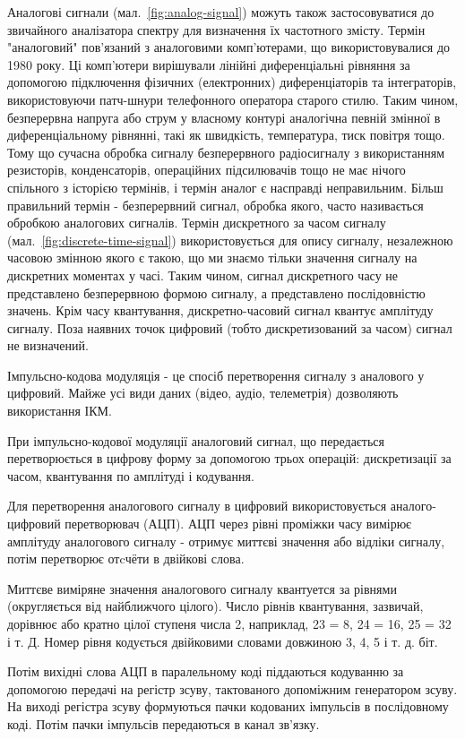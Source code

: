 Аналогові сигнали (мал.~\ref{fig:analog-signal}) можуть також застосовуватися до звичайного аналізатора спектру для визначення їх частотного змісту. Термін "аналоговий" пов'язаний з аналоговими комп'ютерами, що використовувалися до 1980 року. Ці комп'ютери вирішували лінійні диференціальні рівняння за допомогою підключення фізичних (електронних) диференціаторів та інтеграторів, використовуючи патч-шнури телефонного оператора старого стилю. Таким чином, безперервна напруга або струм у власному контурі аналогічна певній змінної в диференціальному рівнянні, такі як швидкість, температура, тиск повітря тощо. Тому що сучасна обробка сигналу безперервного радіосигналу з використанням резисторів, конденсаторів, операційних підсилювачів тощо не має нічого спільного з історією термінів, і термін аналог є насправді неправильним. Більш правильний термін - безперервний сигнал, обробка якого, часто називається обробкою аналогових сигналів. 
Термін дискретного за часом сигналу (мал.~\ref{fig:discrete-time-signal}) використовується для опису сигналу, незалежною часовою змінною якого є такою, що ми знаємо тільки значення сигналу на дискретних моментах у часі. Таким чином, сигнал дискретного часу не представлено безперервною формою сигналу, а представлено послідовністю значень. Крім часу квантування, дискретно-часовий сигнал квантує амплітуду сигналу. \cite{lyons2004understanding} Поза наявних точок цифровий (тобто дискретизований за часом) сигнал не визначений.

Імпульсно-кодова модуляція - це спосіб перетворення сигналу з аналового у цифровий. Майже усі види даних (відео, аудіо, телеметрія) дозволяють використання ІКМ.

При імпульсно-кодової модуляції аналоговий сигнал, що передається перетворюється в цифрову форму за допомогою трьох операцій: дискретизації за часом, квантування по амплітуді і кодування.

Для перетворення аналогового сигналу в цифровий використовується аналого-цифровий перетворювач (АЦП). АЦП через рівні проміжки часу вимірює амплітуду аналогового сигналу - отримує миттєві значення або відліки сигналу, потім перетворює отcчёти в двійкові слова.

Миттєве виміряне значення аналогового сигналу квантуется за рівнями (округляється від найближчого цілого). Число рівнів квантування, зазвичай, дорівнює або кратно цілої ступеня числа 2, наприклад, 23 = 8, 24 = 16, 25 = 32 і т. Д. Номер рівня кодується двійковими словами довжиною 3, 4, 5 і т. д. біт.

Потім вихідні слова АЦП в паралельному коді піддаються кодуванню за допомогою передачі на регістр зсуву, тактованого допоміжним генератором зсуву. На виході регістра зсуву формуються пачки кодованих імпульсів в послідовному коді. Потім пачки імпульсів передаються в канал зв'язку.

